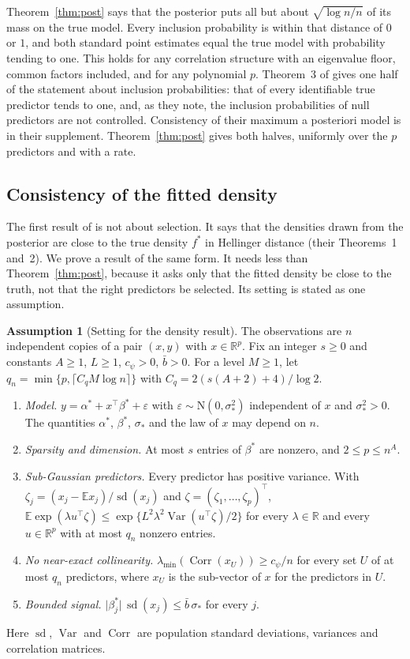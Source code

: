 \documentclass[11pt]{article}
\newcommand{\R}{\mathbb{R}}
\newcommand{\E}{\mathbb{E}}
\newcommand{\N}{\mathrm{N}}
\newcommand{\abs}[1]{\lvert #1\rvert}
\newcommand{\Var}{\operatorname{Var}}
\newcommand{\Corr}{\operatorname{Corr}}
\newcommand{\sd}{\operatorname{sd}}
\newcommand{\lmin}{\lambda_{\min}}
\newcommand{\bstar}{\beta^*}
\newcommand{\sigs}{\sigma_*}
\newcommand{\rn}{\sqrt{\log n/n}}
\theoremstyle{plain}
\theoremstyle{definition}
\newtheorem{asm}{Assumption}
\begin{document}
Theorem~\ref{thm:post} says that the posterior puts all but about $\rn$ of its mass on the true model. Every inclusion
probability is within that distance of $0$ or $1$, and both standard point estimates equal the true model with
probability tending to one. This holds for any correlation structure with an eigenvalue floor, common factors included,
and for any polynomial $p$. Theorem~3 of \citet{SongLiang2015} gives one half of the statement about inclusion
probabilities: that of every identifiable true predictor tends to one, and, as they note, the inclusion probabilities
of null predictors are not controlled. Consistency of their maximum a posteriori model is in their supplement.
Theorem~\ref{thm:post} gives both halves, uniformly over the $p$ predictors and with a rate.

\subsection{Consistency of the fitted density}\label{sec:density}

The first result of \citet{SongLiang2015} is not about selection. It says that the densities drawn from the posterior
are close to the true density $f^*$ in Hellinger distance (their Theorems~1 and~2). We prove a result of the same form.
It needs less than Theorem~\ref{thm:post}, because it asks only that the fitted density be close to the truth, not that
the right predictors be selected. Its setting is stated as one assumption.

\begin{asm}[Setting for the density result]\label{a:dist}
The observations are $n$ independent copies of a pair $(x,y)$ with $x\in\R^p$. Fix an integer $s\ge0$ and constants
$A\ge1$, $L\ge1$, $c_\psi>0$, $\bar b>0$. For a level $M\ge1$, let $q_n=\min\{p,\lceil C_qM\log n\rceil\}$ with
$C_q=2(s(A+2)+4)/\log2$.
\begin{enumerate}[label=(\alph*)]
  \item \emph{Model.} $y=\alpha^*+x^\top\bstar+\varepsilon$ with $\varepsilon\sim\N(0,\sigs^2)$ independent of $x$ and
    $\sigs^2>0$. The quantities $\alpha^*$, $\bstar$, $\sigs$ and the law of $x$ may depend on $n$.
  \item \emph{Sparsity and dimension.} At most $s$ entries of $\bstar$ are nonzero, and $2\le p\le n^A$.
  \item \emph{Sub-Gaussian predictors.} Every predictor has positive variance. With
    $\zeta_j=(x_j-\E x_j)/\sd(x_j)$ and $\zeta=(\zeta_1,\dots,\zeta_p)^\top$,
    $\E\exp(\lambda u^\top\zeta)\le\exp\{L^2\lambda^2\Var(u^\top\zeta)/2\}$ for every $\lambda\in\R$ and every $u\in\R^p$
    with at most $q_n$ nonzero entries.
  \item \emph{No near-exact collinearity.} $\lmin(\Corr(x_U))\ge c_\psi/n$ for every set $U$ of at most $q_n$
    predictors, where $x_U$ is the sub-vector of $x$ for the predictors in $U$.
  \item \emph{Bounded signal.} $\abs{\beta^*_j}\,\sd(x_j)\le\bar b\,\sigs$ for every $j$.
\end{enumerate}
Here $\sd$, $\Var$ and $\Corr$ are population standard deviations, variances and correlation matrices.
\end{asm}
\end{document}
